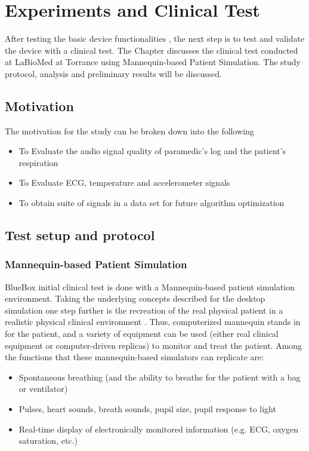 \chapter{Experiments and Clinical Test}
After testing the basic device functionalities , the next step is to test and validate the device with a clinical test. The Chapter discusses the clinical test conducted at LaBioMed at Torrance using Mannequin-based Patient Simulation. The study protocol, analysis and preliminary results will be discussed.

\section{Motivation}
The motivation for the study can be broken down into the following
\begin{itemize}
	\item To Evaluate the audio signal quality of paramedic's log and the patient's respiration
	
	\item To Evaluate ECG, temperature and accelerometer signals
	
	\item To obtain suite of signals in a data set for future algorithm optimization
	 
\end{itemize}
\section{Test setup and protocol}

\subsection{Mannequin-based Patient Simulation}
BlueBox initial clinical test is done with a Mannequin-based patient simulation environment.
Taking the underlying concepts described for the desktop simulation one step further is the recreation of the real physical patient in a realistic physical clinical environment \cite{man}. Thus, computerized mannequin stands in for the patient, and a variety of equipment can be used (either real clinical equipment or computer-driven replicas) to monitor and treat the patient.
Among the functions that these mannequin-based simulators can replicate are:
\begin{itemize}
	\item Spontaneous breathing (and the ability to breathe for the patient with a bag or ventilator)
	\item Pulses, heart sounds, breath sounds, pupil size, pupil response to light
	
	\item Real-time display of electronically monitored information (e.g. ECG, oxygen saturation, etc.)	
\end{itemize}

